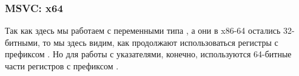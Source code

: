 \subsubsection{MSVC: x64}


Так как здесь мы работаем с переменными типа \Tint, а они в x86-64 остались 32-битными, то мы здесь видим, как продолжают использоваться регистры с префиксом .
Но для работы с указателями, конечно, используются 64-битные части регистров с префиксом .



